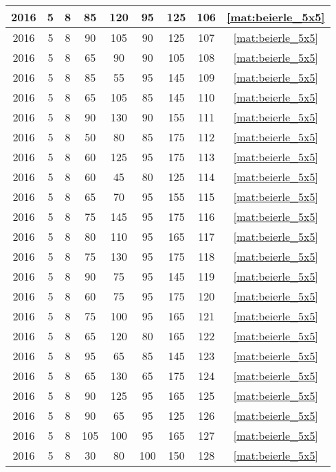 \begin{longtable}{|c|c|c|c|c|c|c|c|c|}
2016 & 5 & 8 & 85 & 120 & 95 & 125 & 106 & \eqref{mat:beierle_5x5} \\ \hline 
2016 & 5 & 8 & 90 & 105 & 90 & 125 & 107 & \eqref{mat:beierle_5x5} \\ \hline 
2016 & 5 & 8 & 65 & 90 & 90 & 105 & 108 & \eqref{mat:beierle_5x5} \\ \hline 
2016 & 5 & 8 & 85 & 55 & 95 & 145 & 109 & \eqref{mat:beierle_5x5} \\ \hline 
2016 & 5 & 8 & 65 & 105 & 85 & 145 & 110 & \eqref{mat:beierle_5x5} \\ \hline 
2016 & 5 & 8 & 90 & 130 & 90 & 155 & 111 & \eqref{mat:beierle_5x5} \\ \hline 
2016 & 5 & 8 & 50 & 80 & 85 & 175 & 112 & \eqref{mat:beierle_5x5} \\ \hline 
2016 & 5 & 8 & 60 & 125 & 95 & 175 & 113 & \eqref{mat:beierle_5x5} \\ \hline 
2016 & 5 & 8 & 60 & 45 & 80 & 125 & 114 & \eqref{mat:beierle_5x5} \\ \hline 
2016 & 5 & 8 & 65 & 70 & 95 & 155 & 115 & \eqref{mat:beierle_5x5} \\ \hline 
2016 & 5 & 8 & 75 & 145 & 95 & 175 & 116 & \eqref{mat:beierle_5x5} \\ \hline 
2016 & 5 & 8 & 80 & 110 & 95 & 165 & 117 & \eqref{mat:beierle_5x5} \\ \hline 
2016 & 5 & 8 & 75 & 130 & 95 & 175 & 118 & \eqref{mat:beierle_5x5} \\ \hline 
2016 & 5 & 8 & 90 & 75 & 95 & 145 & 119 & \eqref{mat:beierle_5x5} \\ \hline 
2016 & 5 & 8 & 60 & 75 & 95 & 175 & 120 & \eqref{mat:beierle_5x5} \\ \hline 
2016 & 5 & 8 & 75 & 100 & 95 & 165 & 121 & \eqref{mat:beierle_5x5} \\ \hline 
2016 & 5 & 8 & 65 & 120 & 80 & 165 & 122 & \eqref{mat:beierle_5x5} \\ \hline 
2016 & 5 & 8 & 95 & 65 & 85 & 145 & 123 & \eqref{mat:beierle_5x5} \\ \hline 
2016 & 5 & 8 & 65 & 130 & 65 & 175 & 124 & \eqref{mat:beierle_5x5} \\ \hline 
2016 & 5 & 8 & 90 & 125 & 95 & 165 & 125 & \eqref{mat:beierle_5x5} \\ \hline 
2016 & 5 & 8 & 90 & 65 & 95 & 125 & 126 & \eqref{mat:beierle_5x5} \\ \hline 
2016 & 5 & 8 & 105 & 100 & 95 & 165 & 127 & \eqref{mat:beierle_5x5} \\ \hline 
2016 & 5 & 8 & 30 & 80 & 100 & 150 & 128 & \eqref{mat:beierle_5x5} \\ \hline 

\end{longtable}
